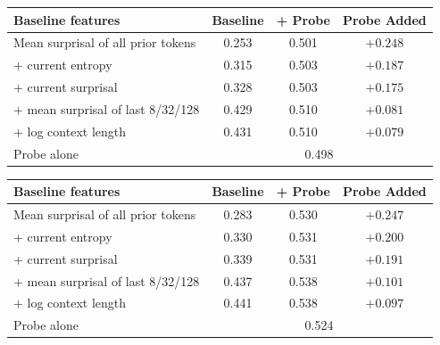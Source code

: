 \begin{tabular}{lccc}
  \toprule
  Baseline features & Baseline & + Probe & Probe Added \\
  \midrule
  Mean surprisal of all prior tokens           & 0.253 & 0.501 & $+0.248$ \\
  \quad + current entropy                      & 0.315 & 0.503 & $+0.187$ \\
  \quad + current surprisal                    & 0.328 & 0.503 & $+0.175$ \\
  \quad + mean surprisal of last 8/32/128      & 0.429 & 0.510 & $+0.081$ \\
  \quad + log context length                   & 0.431 & 0.510 & $+0.079$ \\
  \midrule
  Probe alone                                  & \multicolumn{3}{c}{0.498} \\
  \bottomrule
\end{tabular}

\begin{tabular}{lccc}
  \toprule
  Baseline features & Baseline & + Probe & Probe Added \\
  \midrule
  Mean surprisal of all prior tokens           & 0.283 & 0.530 & $+0.247$ \\
  \quad + current entropy                      & 0.330 & 0.531 & $+0.200$ \\
  \quad + current surprisal                    & 0.339 & 0.531 & $+0.191$ \\
  \quad + mean surprisal of last 8/32/128      & 0.437 & 0.538 & $+0.101$ \\
  \quad + log context length                   & 0.441 & 0.538 & $+0.097$ \\
  \midrule
  Probe alone                                  & \multicolumn{3}{c}{0.524} \\
  \bottomrule
\end{tabular}


